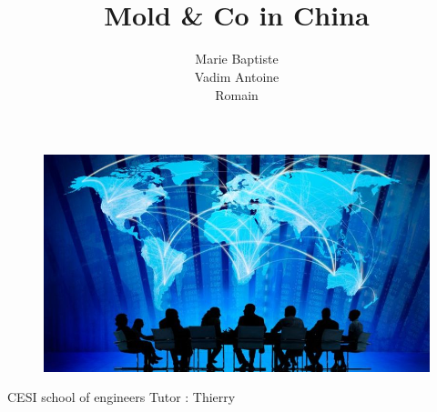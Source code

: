 \documentclass{article}
\begin{document}
\begin{titlepage}
\begin{figure}
\end{figure}

\title{ \\ \vspace{2cm} \bf{Mold \& Co in China} \vspace{1cm} \\
}
\begin{figure}
\begin{center}
\includegraphics[scale = 0.5]{Img/randomDessin.jpg}
\end{center}
\end{figure}
\author{\Large{Marie } \Large{Baptiste  } \\\Large{Vadim  } \Large{Antoine  } \\\Large{Romain  }}
\date{}
\vfill 
\end{titlepage}
\maketitle
\vspace{5.5cm}
\Large{CESI school of engineers} \hfill \Large{Tutor : Thierry }
\thispagestyle{empty}
\setcounter{page}{0}
\end{document}
